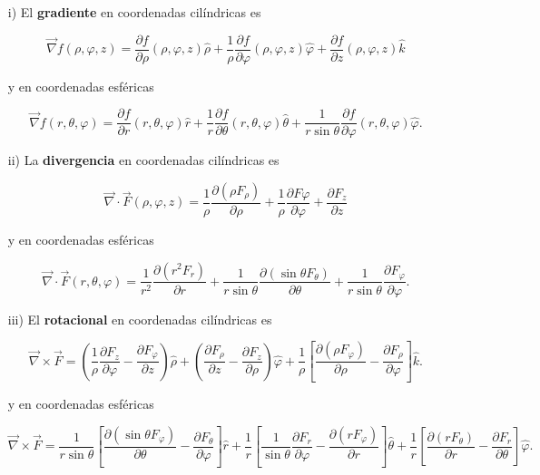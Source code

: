 \begin{itemize}
\item[i)] El \textbf{gradiente} en coordenadas cilíndricas es
\begin{shaded}
    $$\vec{\nabla} f(\rho, \varphi,z) = \frac{\partial f}{\partial \rho} (\rho, \varphi, z) \hat{\rho} + \frac{1}{\rho}  \frac{\partial f}{\partial \varphi} (\rho, \varphi, z) \hat{\varphi} + \frac{\partial f}{\partial z} (\rho, \varphi, z) \hat{k}$$
\end{shaded}

y en coordenadas esféricas
\begin{shaded}
    $$\vec{\nabla} f(r, \theta,\varphi) = \frac{\partial f}{\partial r} (r, \theta, \varphi) \hat{r} + \frac{1}{r} \frac{\partial f}{\partial \theta}(r, \theta, \varphi) \hat{\theta} + \frac{1}{r\sin\theta}\frac{\partial f}{\partial \varphi}(r, \theta, \varphi) \hat{\varphi}.$$
\end{shaded}

\item[ii)] La \textbf{divergencia} en coordenadas cilíndricas es
\begin{shaded}
    $$\vec{\nabla} \cdot \vec{F}(\rho, \varphi,z) = \frac{1}{\rho} \frac{\partial(\rho F_{\rho})}{\partial \rho} + \frac{1}{\rho} \frac{\partial F{\varphi}}{\partial\varphi} + \frac{\partial F_z}{\partial z}$$
\end{shaded}

y en coordenadas esféricas
\begin{shaded}
    $$\vec{\nabla} \cdot \vec{F}(r,\theta, \varphi) = \frac{1}{r^2} \frac{\partial (r^2 F_r)}{\partial r} + \frac{1}{r\sin\theta} \frac{\partial (\sin\theta F_{\theta})}{\partial \theta} + \frac{1}{r\sin\theta} \frac{\partial F_{\varphi}}{\partial \varphi}.$$
\end{shaded}

\item[iii)] El \textbf{rotacional} en coordenadas cilíndricas es
\begin{shaded}
    $$\vec{\nabla} \times \vec{F} = \left( \frac{1}{\rho} \frac{\partial F_z}{\partial \varphi} - \frac{\partial F_{\varphi}}{\partial z}\right) \hat{\rho} + \left( \frac{\partial F_{\rho}}{\partial z} - \frac{\partial F_z}{\partial \rho}\right) \hat{\varphi} + \frac{1}{\rho} \left[ \frac{\partial (\rho F_{\varphi})}{\partial \rho} - \frac{\partial F_{\rho}}{\partial \varphi} \right] \hat{k}.$$
\end{shaded}

y en coordenadas esféricas
\begin{shaded}
    $$\vec{\nabla} \times \vec{F} = \frac{1}{r \sin \theta} \left[ \frac{\partial (\sin\theta F_{\varphi})}{\partial \theta} - \frac{\partial F_{\theta}}{\partial \varphi} \right]\hat{r} + \frac{1}{r} \left[ \frac{1}{\sin \theta} \frac{\partial F_r}{\partial \varphi} - \frac{\partial (r F_{\varphi})}{\partial r} \right] \hat{\theta} 
     + \frac{1}{r} \left[ \frac{\partial (rF_{\theta})}{\partial r} - \frac{\partial F_r}{\partial \theta} \right] \hat{\varphi}.$$
\end{shaded}



\end{itemize}
